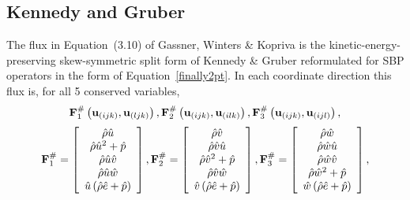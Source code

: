 \subsection{Kennedy and Gruber}
The flux in Equation~(3.10) of Gassner, Winters \& Kopriva\cite{} is 
the kinetic-energy-preserving skew-symmetric split form of Kennedy \& Gruber\cite{kg}
reformulated for SBP operators in the form of Equation~\ref{finally2pt}. In
each coordinate direction this flux is, for all 5 conserved variables,
\begin{equation}
{\bf F}_1^{\#}\left({\bf u}_{(ijk)},{\bf u}_{(ljk)}\right),
{\bf F}_2^{\#}\left({\bf u}_{(ijk)},{\bf u}_{(ilk)}\right),
{\bf F}_3^{\#}\left({\bf u}_{(ijk)},{\bf u}_{(ijl)}\right),
\label{someargs}
\end{equation}
\begin{equation}
{\bf F}_1^{\#}=\left[\begin{array}{c} \hat{\rho}\hat{u} \\
                               \hat{\rho}\hat{u}^2 + \hat{p} \\ 
                               \hat{\rho}\hat{u}\hat{v} \\ 
                               \hat{\rho}\hat{u}\hat{w} \\ 
                               \hat{u}\left(\hat{\rho}\hat{e} +\hat{p}\right)
              \end{array}\right], 
{\bf F}_2^{\#}=\left[\begin{array}{c} \hat{\rho}\hat{v} \\
                               \hat{\rho}\hat{v}\hat{u} \\ 
                               \hat{\rho}\hat{v}^2 + \hat{p} \\ 
                               \hat{\rho}\hat{v}\hat{w} \\ 
                               \hat{v}\left(\hat{\rho}\hat{e} +\hat{p}\right)
              \end{array}\right], 
{\bf F}_3^{\#}=\left[\begin{array}{c} \hat{\rho}\hat{w} \\
                               \hat{\rho}\hat{w}\hat{u} \\ 
                               \hat{\rho}\hat{w}\hat{v} \\ 
                               \hat{\rho}\hat{w}^2 + \hat{p} \\ 
                               \hat{w}\left(\hat{\rho}\hat{e} +\hat{p}\right)
              \end{array}\right], 
\label{kennedygruber}
\end{equation}
